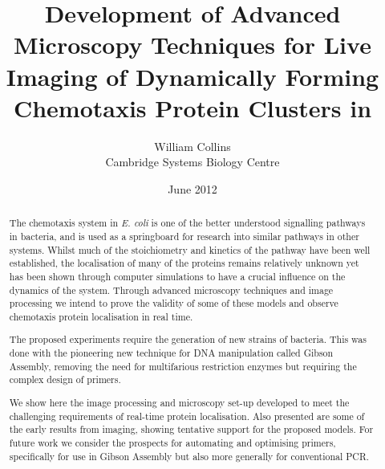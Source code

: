 \documentclass[12pt]{article}
\title{Development of Advanced Microscopy Techniques for Live Imaging of Dynamically Forming Chemotaxis Protein Clusters in \ecoli}
\date{June 2012}
\author{William Collins\\Cambridge Systems Biology Centre}
\newcommand{\ecoli}{\textit{E. coli}\xspace}			%
\begin{document}
\maketitle
\begin{abstract}
The chemotaxis system in \ecoli is one of the better understood signalling pathways in bacteria, and is used as a springboard for research into similar pathways in other systems. Whilst much of the stoichiometry and kinetics of the pathway have been well established, the localisation of many of the proteins remains relatively unknown yet has been shown through computer simulations to have a crucial influence on the dynamics of the system. Through advanced microscopy techniques and image processing we intend to prove the validity of some of these models and observe chemotaxis protein localisation in real time.


The proposed experiments require the generation of new strains of bacteria. This was done with the pioneering new technique for DNA manipulation called Gibson Assembly, removing the need for multifarious restriction enzymes but requiring the complex design of primers.


We show here the image processing and microscopy set-up developed to meet the challenging requirements of real-time protein localisation. Also presented are some of the early results from imaging, showing tentative support for the proposed models. For future work we consider the prospects for automating and optimising primers, specifically for use in Gibson Assembly but also more generally for conventional PCR.
\end{abstract}
\newpage
\tableofcontents
\cleardoublepage

\cleardoublepage


\cleardoublepage


\cleardoublepage


\cleardoublepage


\cleardoublepage

\appendix

\cleardoublepage


\cleardoublepage


\cleardoublepage

\printbibliography
\end{document}
